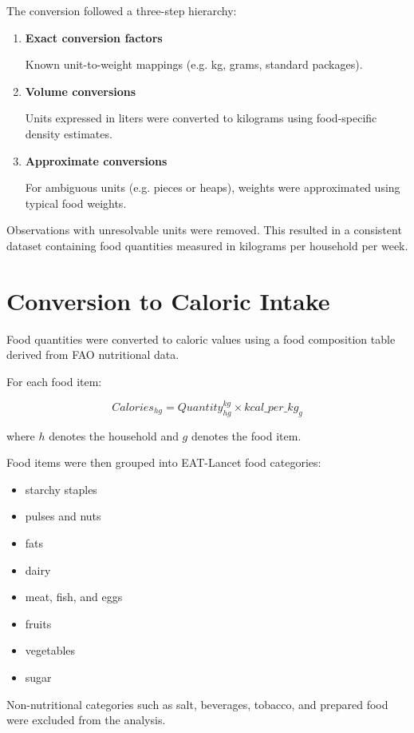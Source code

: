 \documentclass{article}
\begin{document}
The conversion followed a three-step hierarchy:

\begin{enumerate}
\item \textbf{Exact conversion factors}  

Known unit-to-weight mappings (e.g. kg, grams, standard packages).

\item \textbf{Volume conversions}  

Units expressed in liters were converted to kilograms using food-specific density estimates.

\item \textbf{Approximate conversions}  

For ambiguous units (e.g. pieces or heaps), weights were approximated using typical food weights.
\end{enumerate}

Observations with unresolvable units were removed. This resulted in a consistent dataset containing food quantities measured in kilograms per household per week.

\section{Conversion to Caloric Intake}

Food quantities were converted to caloric values using a food composition table derived from FAO nutritional data.

For each food item:

\[
Calories_{hg} = Quantity^{kg}_{hg} \times kcal\_per\_kg_g
\]

where $h$ denotes the household and $g$ denotes the food item.

Food items were then grouped into EAT-Lancet food categories:

\begin{itemize}
\item starchy staples
\item pulses and nuts
\item fats
\item dairy
\item meat, fish, and eggs
\item fruits
\item vegetables
\item sugar
\end{itemize}

Non-nutritional categories such as salt, beverages, tobacco, and prepared food were excluded from the analysis.
\end{document}

